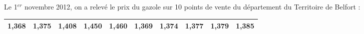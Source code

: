 \item Le 1$^{er}$ novembre 2012, on a relevé le prix du gazole sur 10 points de vente du département du Territoire de Belfort :

\begin{center}
	\begin{tabular}{|@{\ }l@{\ }|@{\ }c@{\ }|@{\ }c@{\ }|@{\ }c@{\ }|@{\ }c@{\ }|@{\ }c@{\ }|@{\ }c@{\ }|@{\ }c@{\ }|@{\ }c@{\ }|@{\ }c@{\ }|}
		\hline
		1,368 & 1,375 & 1,408 & 1,450 & 1,460 & 1,369 & 1,374 & 1,377 & 1,379 & 1,385 \\ \hline			
	\end{tabular}
\end{center}